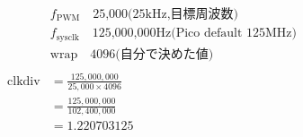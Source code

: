 \begin{align*}
& f_{\mathrm{PWM}} \quad \text{25,000(25kHz,目標周波数)} \\
& f_{\mathrm{sysclk}} \quad \text{125,000,000Hz(Pico default 125MHz)} \\
& \mathrm{wrap}    \quad \text{4096(自分で決めた値)} \\
\\
\mathrm{clkdiv} &= \frac{125,000,000}{25,000 \times 4096} \\
&= \frac{125,000,000}{102,400,000} \\
&= 1.220703125
\end{align*}